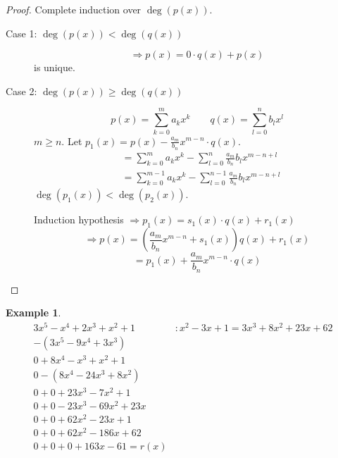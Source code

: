 \documentclass[a4paper,landscape,twocolumn]{article}
\theoremstyle{definition}
\newtheorem{ex}{Example}
\begin{document}
\begin{proof}
  Complete induction over $\deg(p(x))$.
  \begin{description}
    \item[Case 1: $\deg(p(x)) < \deg(q(x))$]
      \[ \Rightarrow p(x) = 0 \cdot q(x) + p(x) \]
      is unique.
    \item[Case 2: $\deg(p(x)) \geq \deg(q(x))$]
      \[ p(x) = \sum_{k=0}^m a_k x^k \qquad q(x) = \sum_{l=0}^n b_l x^l \]
      $m \geq n$.
      Let $p_1(x) = p(x) - \frac{a_m}{b_n} x^{m-n} \cdot q(x)$.
      \begin{align*}
        &= \sum_{k=0}^m a_k x^k - \sum_{l=0}^n \frac{a_m}{b_n} b_l x^{m-n+l} \\
        &= \sum_{k=0}^{m-1} a_k x^k - \sum_{l=0}^{n-1} \frac{a_m}{b_n} b_l x^{m-n+l}
      \end{align*}
      $\deg(p_1(x)) < \deg(p_2(x))$.

      Induction hypothesis $\Rightarrow p_1(x) = s_1(x) \cdot q(x) + r_1(x)$
      \[ \Rightarrow p(x) = \left(\frac{a_m}{b_n} x^{m-n} + s_1(x)\right) q(x) + r_1(x) \]
      \[ = p_1(x) + \frac{a_m}{b_n} x^{m-n} \cdot q(x) \]
  \end{description}
\end{proof}

\begin{ex}
  \label{bsp-9.18}
  \[
    \begin{array}{rl}
      3x^5 - x^4 + 2x^3 + x^2 + 1 &: x^2 - 3x + 1 = 3x^3 + 8x^2 + 23x + 62 \\
      -(3x^5 - 9x^4 + 3x^3)       &\\
    \hline
      0 + 8x^4 - x^3 + x^2 + 1 \\
      0 - (8x^4 - 24x^3 + 8x^2) \\
    \hline
      0 + 0 + 23x^3 - 7x^2 + 1 \\
      0 + 0 - 23x^3 - 69x^2 + 23x \\
    \hline
      0 + 0 + 62x^2 - 23x + 1 \\
      0 + 0 + 62x^2 - 186x + 62 \\
    \hline
      0 + 0 + 0 + 163x - 61 = r(x)
    \end{array}
  \]
\end{ex}

\clearpage
\begin{otherlanguage}{ngerman}
\printindex[German]
\end{otherlanguage}
\printindex[English]
\end{document}
